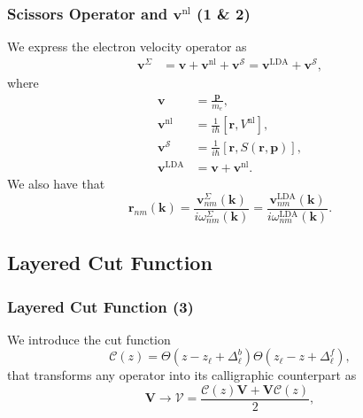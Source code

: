 \documentclass{beamer}
\begin{document}
\begin{frame}
\frametitle{Scissors Operator and
\texorpdfstring{$\mathbf{v}^{\mathrm{nl}}$}{vnl} (1 \& 2)}
We express the electron velocity operator as
\begin{equation*}\label{vop2}
\begin{split}
\mathbf{v}^{\Sigma}
&=\mathbf{v} + \mathbf{v}^{\mathrm{nl}} 
+ \mathbf{v}^{\mathcal{S}}
= \mathbf{v}^\mathrm{LDA} + \mathbf{v}^{\mathcal{S}},
\end{split}
\end{equation*}
where
\begin{equation*}\label{conhr}
\begin{split}
\mathbf{v} &=\frac{\mathbf{p}}{m_{e}},\\
\mathbf{v}^{\mathrm{nl}} &= \frac{1}{i\hbar}
  \left[\mathbf{r},V^{\mathrm{nl}}\right],\\
\mathbf{v}^{\mathcal{S}} &= \frac{1}{i\hbar}
  \left[\mathbf{r},S(\mathbf{r},\mathbf{p})\right],\\
\mathbf{v}^\mathrm{LDA} &= \mathbf{v}+\mathbf{v}^{\mathrm{nl}}.
\end{split}
\end{equation*}
We also have that
\begin{equation*}
\mathbf{r}_{nm}(\mathbf{k})
= \frac{\mathbf{v}^{\Sigma}_{nm}(\mathbf{k})}{i\omega^{\Sigma}_{nm}(\mathbf{k})}
= \frac{\mathbf{v}^{\mathrm{LDA}}_{nm}(\mathbf{k})}{i\omega^{\mathrm{LDA}}_{nm}(\mathbf{k})}.
\end{equation*} 
\end{frame}



\subsection{Layered Cut Function}

\begin{frame}
\frametitle{Layered Cut Function (3)}
We introduce the cut function
\begin{equation*}
{\boldsymbol{\mathcal{C}}}(z)=\Theta(z-z_\ell+\Delta_\ell^{b})  
            \Theta(z_\ell-z+\Delta_\ell^f),
\label{sz}
\end{equation*}
that transforms any operator into its calligraphic counterpart as
\begin{equation*}
\mathbf{V} \to \boldsymbol{\mathcal{V}}
= \frac{\boldsymbol{\mathcal{C}}(z) \mathbf{V}
+ \mathbf{V} \boldsymbol{\mathcal{C}}(z)}{2},
\label{vcali}
\end{equation*} 
\end{frame}
\end{document}
